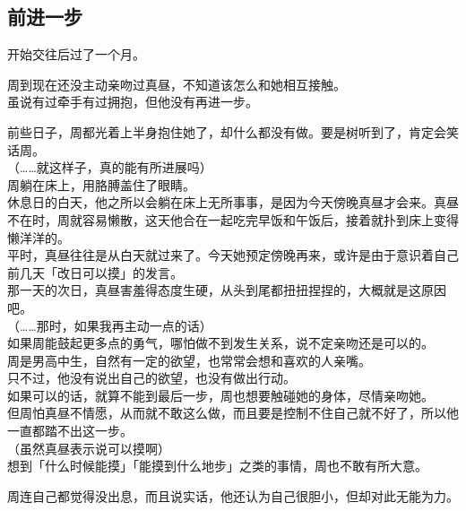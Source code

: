 \subsection{前进一步}

开始交往后过了一个月。

周到现在还没主动亲吻过真昼，不知道该怎么和她相互接触。\\

虽说有过牵手有过拥抱，但他没有再进一步。

前些日子，周都光着上半身抱住她了，却什么都没有做。要是树听到了，肯定会笑话周。\\

（……就这样子，真的能有所进展吗）\\

周躺在床上，用胳膊盖住了眼睛。\\

休息日的白天，他之所以会躺在床上无所事事，是因为今天傍晚真昼才会来。真昼不在时，周就容易懒散，这天他合在一起吃完早饭和午饭后，接着就扑到床上变得懒洋洋的。\\

平时，真昼往往是从白天就过来了。今天她预定傍晚再来，或许是由于意识着自己前几天「改日可以摸」的发言。\\

那一天的次日，真昼害羞得态度生硬，从头到尾都扭扭捏捏的，大概就是这原因吧。\\

（……那时，如果我再主动一点的话）\\

如果周能鼓起更多点的勇气，哪怕做不到发生关系，说不定亲吻还是可以的。\\

周是男高中生，自然有一定的欲望，也常常会想和喜欢的人亲嘴。\\

只不过，他没有说出自己的欲望，也没有做出行动。\\

如果可以的话，就算不能到最后一步，周也想要触碰她的身体，尽情亲吻她。\\

但周怕真昼不情愿，从而就不敢这么做，而且要是控制不住自己就不好了，所以他一直都踏不出这一步。\\

（虽然真昼表示说可以摸啊）\\

想到「什么时候能摸」「能摸到什么地步」之类的事情，周也不敢有所大意。

周连自己都觉得没出息，而且说实话，他还认为自己很胆小，但却对此无能为力。\\

